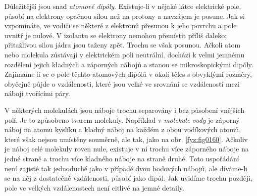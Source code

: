   Důležitější jsou snad \emph{atomové dipóly}. Existuje-li v nějaké látce elektrické pole, působí na
  elektrony opačnou silou než na protony a navzájem je posune. Jak si vzpomínáte, ve vodiči se
  některé z elektronů přesunou k jeho povrchu a pole uvnitř je nulové. V izolantu se elektrony
  nemohou přemístit příliš daleko; přitažlivou silou jádra jsou taženy zpět. Trochu se však posunou.
  Ačkoli atom nebo molekula zůstávají v elektrickém poli neutrální, dochází k velmi jemnému
  rozdělení jejich kladných a záporných nábojů a stanou se mikroskopickými dipóly. Zajímáme-li se o
  pole těchto atomových dipólů v okolí těles s obvyklými rozměry, obyčejně půjde o vzdálenosti,
  které jsou velké ve srovnání se vzdáleností mezi náboji tvořícími páry.
  
  V některých molekulách jsou náboje trochu separovány i bez působení vnějších polí. Je to způsobeno
  tvarem molekuly. Například v \emph{molekule vody} je záporný náboj na atomu kyslíku a kladný náboj
  na každém z obou vodíkových atomů, které však nejsou umístěny souměrně, ale tak, jako na obr.
  \ref{fyz:fig0160}. Ačkoliv je náboj celé molekuly roven nule, existuje v ní trochu více záporného
  náboje na jedné straně a trochu více kladného náboje na straně druhé. Toto uspořádání není zajisté
  tak jednoduché jako v případě dvou bodových nábojů, ale díváme-li se na něj z dostatečné
  vzdálenosti, působí jako dipól. Jak uvidíme trochu později, pole ve velkých vzdálenostech není
  citlivé na jemné detaily.

